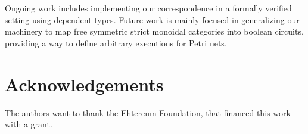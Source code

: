 \documentclass[submission,copyright,creativecommons,sharealike,noncommercial]{eptcs}
\begin{document}
Ongoing work includes implementing our correspondence in a 
formally verified setting using dependent types. Future work is 
mainly focused in generalizing our machinery to map free symmetric
strict monoidal categories into boolean circuits, providing a way to 
define arbitrary executions for Petri nets.
%
%
%
\section*{Acknowledgements}
The authors want to thank the Ehtereum Foundation, 
that financed this work with a grant.

%
%




\clearpage
\appendix

\end{document}
